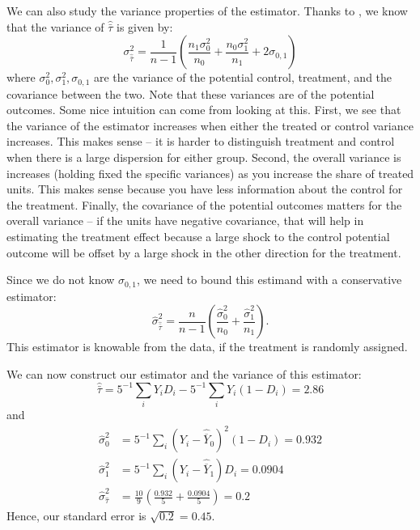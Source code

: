 \documentclass{tufte-handout}
\theoremstyle{break}
\newcommand{\continuation}{??}
\newenvironment{continueexample}[1]
 {\renewcommand{\continuation}{\ref{#1}}\excont[continued]}
 {\endexcont}
\begin{document}
We can also study the variance properties of the estimator. Thanks to \citet{neyman1990}, we know that the variance of $\hat{\bar{\tau}}$ is given by:
\begin{equation}
  \sigma^{2}_{\hat{\bar{\tau}}} = \frac{1}{n-1}\left(\frac{n_{1}\sigma^{2}_{0}}{n_{0}} + \frac{n_{0} \sigma^{2}_{1}}{n_{1}} + 2\sigma_{0,1}\right)
\end{equation}
where $\sigma^{2}_{0}, \sigma^{2}_{1}, \sigma_{0,1}$ are the variance of the potential control, treatment, and the covariance between the two. Note that these variances are of the potential outcomes. Some nice intuition can come from looking at this. First, we see that the variance of the estimator increases when either the treated or control variance increases. This makes sense -- it is harder to distinguish treatment and control when there is a large dispersion for either group. Second, the overall variance is increases (holding fixed the specific variances) as you increase the share of treated units. This makes sense because you have less information about the control for the treatment. Finally, the covariance of the potential outcomes matters for the overall variance -- if the units have negative covariance, that will help in estimating the treatment effect because a large shock to the control potential outcome will be offset by a large shock in the other direction for the treatment.

Since we do not know $\sigma_{0,1}$, we need to bound this estimand with a conservative estimator:
\begin{equation}
  \hat{\sigma}^{2}_{\hat{\bar{\tau}}} = \frac{n}{n-1}\left(\frac{\hat{\sigma}^{2}_{0}}{n_{0}} + \frac{ \hat{\sigma}^{2}_{1}}{n_{1}}\right).
\end{equation}
This estimator is knowable from the data, if the treatment is randomly assigned. 

\begin{boxD}
  \begin{continueexample}{example1_randomization}
    \label{example2_randomization}
    We can now construct our estimator and the variance of this estimator:
    \begin{equation*}
      \hat{\bar{\tau}} = 5^{-1}\sum_{i}Y_{i}D_{i} - 5^{-1}\sum_{i}Y_{i}(1-D_{i}) = 2.86
    \end{equation*}
    and
    \begin{align*}
      \hat{\sigma}^{2}_{0} &= 5^{-1}\sum_{i}(Y_{i}-\hat{\overline{Y}}_{0})^{2}(1-D_{i}) = 0.932\\
       \hat{\sigma}^{2}_{1} &= 5^{-1}\sum_{i}(Y_{i}-\hat{\overline{Y}}_{1})D_{i} = 0.0904\\
      \hat{\sigma}^{2}_{\hat{\tau}} &= \frac{10}{9}\left(\frac{0.932}{5} + \frac{0.0904}{5}\right) =  0.2
    \end{align*}
    Hence, our standard error is $\sqrt{0.2} = 0.45$.
  \end{continueexample}
\end{boxD}
\end{document}
